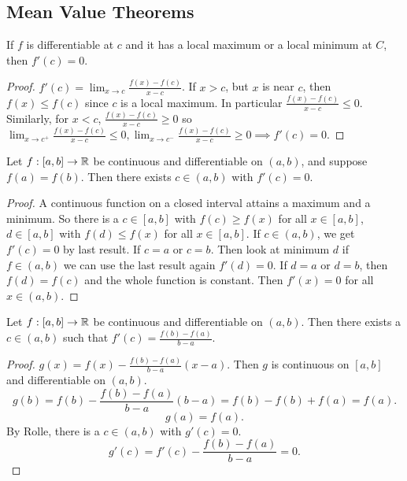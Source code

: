\documentclass[10pt, a4paper]{article}
\begin{document}
\subsection{Mean Value Theorems}

\begin{proposition}
    If $f$ is differentiable at $c$ and it has a local maximum or a local minimum at $C$,
    then $f'(c) = 0$.

    \begin{proof}
        $f'(c) = \lim_{x \to c}\frac{f(x) - f(c)}{x - c}$.
        If $x > c$,
        but $x$ is near $c$,
        then $f(x) \leq f(c)$ since $c$ is a local maximum.
        In particular $\frac{f(x) - f(c)}{x - c} \leq 0$.
        Similarly,
        for $x < c$,
        $\frac{f(x) - f(c)}{x - c} \geq 0$ so $\lim_{x \to c ^ {+}}\frac{f(x) - f(c)}{x - c} \leq 0, \lim_{x \to c ^ {-}}\frac{f(x) - f(c)}{x - c} \geq 0 \implies f'(c) = 0$.
    \end{proof}
\end{proposition}

\begin{theorem}
    Let $f : [a, b] \to \mathbb{R}$ be continuous and differentiable on $(a, b)$,
    and suppose $f(a) = f(b)$.
    Then there exists $c \in (a, b)$ with $f'(c) = 0$.

    \begin{proof}
        A continuous function on a closed interval attains a maximum and a minimum.
        So there is a $c \in [a, b]$ with $f(c) \geq f(x)$ for all $x \in [a, b]$,
        $d \in [a, b]$ with $f(d) \leq f(x)$ for all $x \in [a, b]$.
        If $c \in (a, b)$,
        we get $f'(c) = 0$ by last result.
        If $c = a$ or $c = b$.
        Then look at minimum $d$ if $f \in (a, b)$ we can use the last result again $f'(d) = 0$.
        If $d = a$ or $d = b$,
        then $f(d) = f(c)$ and the whole function is constant.
        Then $f'(x) = 0$ for all $x \in (a, b)$.
    \end{proof}
\end{theorem}

\begin{theorem}
    Let $f : [a, b] \to \mathbb{R}$ be continuous and differentiable on $(a, b)$.
    Then there exists a $c \in (a, b)$ such that $f'(c) = \frac{f(b) - f(a)}{b - a}$.

    \begin{proof}
        $g(x) = f(x) - \frac{f(b) - f(a)}{b - a}(x - a)$.
        Then $g$ is continuous on $[a, b]$ and differentiable on $(a, b)$.
        \[
        g(b) = f(b) - \frac{f(b) - f(a)}{b - a}(b - a) = f(b) - f(b) + f(a) = f(a).
        \]
        \[
        g(a) = f(a).
        \]
        By Rolle,
        there is a $c \in (a, b)$ with $g'(c) = 0$.
        \[
        g'(c) = f'(c) - \frac{f(b) - f(a)}{b - a} = 0.
        \]
    \end{proof}
\end{theorem}
\end{document}
